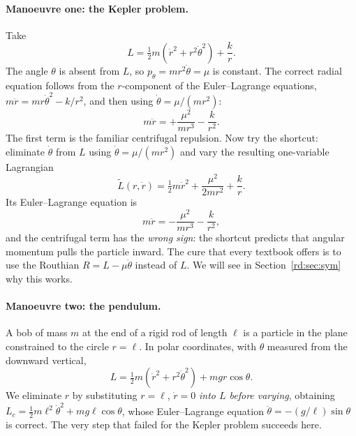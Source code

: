 \paragraph{Manoeuvre one: the Kepler problem.} Take
\begin{equation}\label{rd:Lkep}
L=\tfrac12m(\dot r^2+r^2\dot\theta^2)+\frac kr .
\end{equation}
The angle $\theta$ is absent from $L$, so $p_\theta=mr^2\dot\theta=\mu$ is constant. The correct radial equation follows from the $r$-component of the Euler--Lagrange equations, $m\ddot r=mr\dot\theta^2-k/r^2$, and then using $\dot\theta=\mu/(mr^2)$:
\begin{equation}\label{rd:kepcorrect}
m\ddot r=+\frac{\mu^2}{mr^3}-\frac{k}{r^2}.
\end{equation}
The first term is the familiar centrifugal repulsion. Now try the shortcut: eliminate $\dot\theta$ from $L$ using $\dot\theta=\mu/(mr^2)$ and vary the resulting one-variable Lagrangian
\begin{equation}\label{rd:Lnaive}
\tilde L(r,\dot r)=\tfrac12m\dot r^2+\frac{\mu^2}{2mr^2}+\frac kr .
\end{equation}
Its Euler--Lagrange equation is
\begin{equation}\label{rd:kepwrong}
m\ddot r=-\frac{\mu^2}{mr^3}-\frac k{r^2},
\end{equation}
and the centrifugal term has the \emph{wrong sign}: the shortcut predicts that angular momentum pulls the particle inward. The cure that every textbook offers is to use the Routhian $R=L-\mu\dot\theta$ instead of $L$. We will see in Section~\ref{rd:sec:sym} why this works.

\paragraph{Manoeuvre two: the pendulum.} A bob of mass $m$ at the end of a rigid rod of length $\ell$ is a particle in the plane constrained to the circle $r=\ell$. In polar coordinates, with $\theta$ measured from the downward vertical,
\begin{equation}\label{rd:Lpend}
L=\tfrac12m(\dot r^2+r^2\dot\theta^2)+mgr\cos\theta .
\end{equation}
We eliminate $r$ by substituting $r=\ell$, $\dot r=0$ \emph{into $L$ before varying}, obtaining $L_c=\tfrac12m\ell^2\dot\theta^2+mg\ell\cos\theta$, whose Euler--Lagrange equation $\ddot\theta=-(g/\ell)\sin\theta$ is correct. The very step that failed for the Kepler problem succeeds here.

